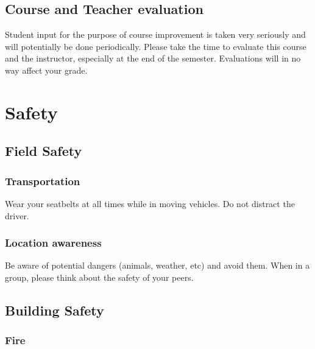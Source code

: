 \documentclass[11pt,]{article}
\begin{document}
\hypertarget{course-and-teacher-evaluation}{%
\subsection{Course and Teacher
evaluation}\label{course-and-teacher-evaluation}}

Student input for the purpose of course improvement is taken very
seriously and will potentially be done periodically. Please take the
time to evaluate this course and the instructor, especially at the end
of the semester. Evaluations will in no way affect your grade.

\newpage

\hypertarget{safety}{%
\section{Safety}\label{safety}}

\hypertarget{field-safety}{%
\subsection{Field Safety}\label{field-safety}}

\hypertarget{transportation}{%
\subsubsection{Transportation}\label{transportation}}

Wear your seatbelts at all times while in moving vehicles. Do not
distract the driver.

\hypertarget{location-awareness}{%
\subsubsection{Location awareness}\label{location-awareness}}

Be aware of potential dangers (animals, weather, etc) and avoid them.
When in a group, please think about the safety of your peers.

\hypertarget{building-safety}{%
\subsection{Building Safety}\label{building-safety}}

\hypertarget{fire}{%
\subsubsection{Fire}\label{fire}}
\end{document}
